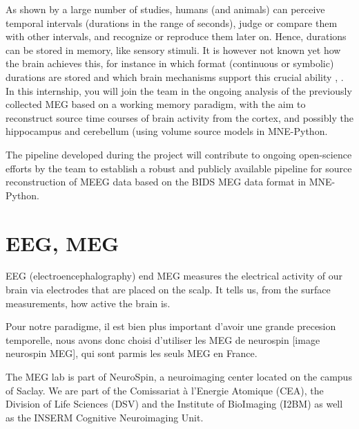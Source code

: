 As shown by a large number of studies, humans (and animals) can perceive
temporal intervals (durations in the range of seconds), judge or compare them with other
intervals, and recognize or reproduce them later on. Hence, durations can be stored in
memory, like sensory stimuli. It is however not known yet how the brain achieves this, for
instance in which format (continuous or symbolic) durations are stored and which brain
mechanisms support this crucial ability \cite{polti2018effect}, \cite{teki2014working}. In this internship, you will join the team in the
ongoing analysis of the previously collected MEG based on a working memory paradigm,
with the aim to reconstruct source time courses of brain activity from the cortex, and
possibly the hippocampus and cerebellum \cite{gauthier2020hippocampal}(using volume source models in MNE-Python.

The pipeline developed during the project will contribute to ongoing open-science
efforts by the team to establish a robust and publicly available pipeline for source
reconstruction of MEEG data based on the BIDS MEG data format in MNE-Python.




\section{EEG, MEG}



EEG (electroencephalography) end MEG measures the electrical activity of our brain via electrodes that are placed on the scalp. It tells us, from the surface measurements, how active the brain is.

Pour notre paradigme, il est bien plus important d'avoir une grande precesion temporelle, nous avons donc choisi d'utiliser les MEG de neurospin [image neurospin MEG], qui sont parmis les seuls MEG en France.


The MEG lab is part of NeuroSpin, a neuroimaging center located on the campus of Saclay. We are part of the Comissariat à l'Energie Atomique (CEA), the Division of Life Sciences (DSV) and the Institute of BioImaging (I2BM) as well as the INSERM Cognitive Neuroimaging Unit.

